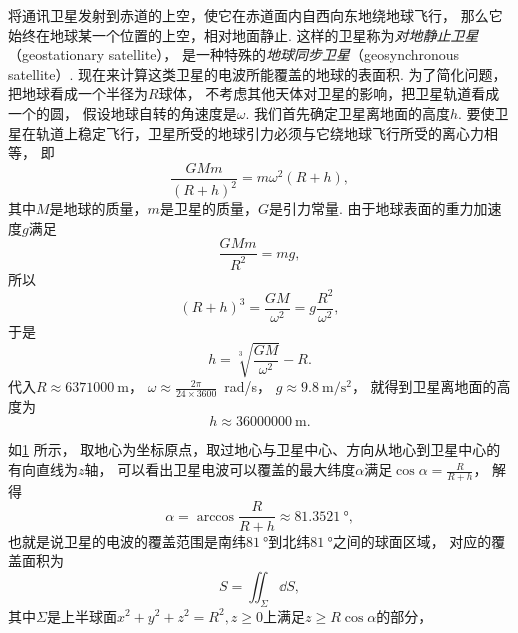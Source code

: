 \begin{example}
将通讯卫星发射到赤道的上空，使它在赤道面内自西向东地绕地球飞行，
那么它始终在地球某一个位置的上空，相对地面静止.
这样的卫星称为\emph{对地静止卫星}（geostationary satellite），
是一种特殊的\emph{地球同步卫星}（geosynchronous satellite）.
现在来计算这类卫星的电波所能覆盖的地球的表面积.
为了简化问题，把地球看成一个半径为\(R\)球体，
不考虑其他天体对卫星的影响，把卫星轨道看成一个的圆，
假设地球自转的角速度是\(\omega\).
我们首先确定卫星离地面的高度\(h\).
要使卫星在轨道上稳定飞行，卫星所受的地球引力必须与它绕地球飞行所受的离心力相等，
即\[
	\frac{GMm}{(R+h)^2}
	= m \omega^2 (R+h),
\]
其中\(M\)是地球的质量，\(m\)是卫星的质量，\(G\)是引力常量.
由于地球表面的重力加速度\(g\)满足\[
	\frac{GMm}{R^2}
	= mg,
\]
所以\[
	(R+h)^3 = \frac{GM}{\omega^2}
	= g\frac{R^2}{\omega^2},
\]
于是\[
	h = \sqrt[3]{\frac{GM}{\omega^2}} - R.
\]
代入\(R \approx \qty{6371000}{\meter}\)，
\(\omega \approx \frac{2\pi}{24 \times 3600}\)~\unit[per-mode=symbol]{\radian\per\second}，
\(g \approx \qty[per-mode=symbol]{9.8}{\meter\per\second\squared}\)，
就得到卫星离地面的高度为\[
	h \approx \qty{36000000}{\meter}.
\]
\begin{figure}[htb]
	\centering
	\caption{}
	\label{figure:线积分与面积分.对地静止卫星}
\end{figure}
如\cref{figure:线积分与面积分.对地静止卫星} 所示，
取地心为坐标原点，取过地心与卫星中心、方向从地心到卫星中心的有向直线为\(z\)轴，
可以看出卫星电波可以覆盖的最大纬度\(\alpha\)满足\(\cos\alpha=\frac{R}{R+h}\)，
解得\[
	\alpha=\arccos\frac{R}{R+h} \approx \qty{81.3521}{\degree},
\]
也就是说卫星的电波的覆盖范围是南纬\(\qty{81}{\degree}\)到北纬\(\qty{81}{\degree}\)之间的球面区域，
对应的覆盖面积为\[
	S = \iint_\Sigma \dd{S},
\]
其中\(\Sigma\)是上半球面\(x^2+y^2+z^2=R^2,z\geq0\)上满足\(z \geq R\cos\alpha\)的部分，

\end{example}
